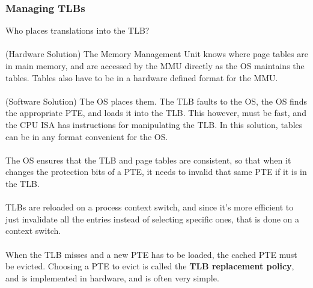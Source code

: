 \documentclass{article}
\begin{document}
\subsubsection{Managing TLBs}

Who places translations into the TLB?\\
\\
(Hardware Solution) The Memory Management Unit knows where page tables are in main memory, and are accessed by the MMU directly as the OS maintains the tables. Tables also have to be in a hardware defined format for the MMU.\\
\\
(Software Solution) The OS places them. The TLB faults to the OS, the OS finds the appropriate PTE, and loads it into the TLB. This however, must be fast, and the CPU ISA has instructions for manipulating the TLB. In this solution, tables can be in any format convenient for the OS.\\
\\
The OS ensures that the TLB and page tables are consistent, so that when it changes the protection bits of a PTE, it needs to invalid that same PTE if it is in the TLB.\\
\\
TLBs are reloaded on a process context switch, and since it's more efficient to just invalidate all the entries instead of selecting specific ones, that is done on a context switch.\\
\\
When the TLB misses and a new PTE has to be loaded, the cached PTE must be evicted. Choosing a PTE to evict is called the \textbf{TLB replacement policy}, and is implemented in hardware, and is often very simple.
\end{document}
